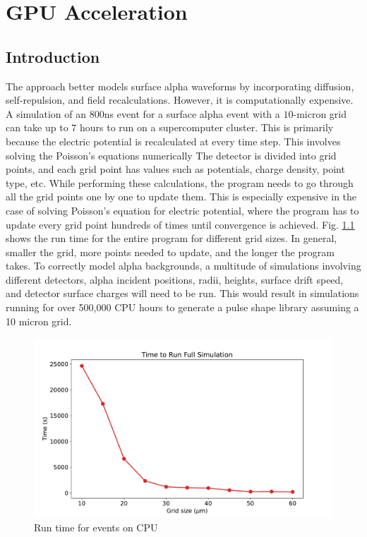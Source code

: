 \chapter{GPU Acceleration}
\label{chap4:gpu}
\section{Introduction}
 


The {\tdsim} approach better models surface alpha waveforms by incorporating diffusion, self-repulsion, and field recalculations. However, it is computationally expensive. A simulation of an $800$ns event for a surface alpha event with a $10$-micron grid can take up to $7$ hours to run on a supercomputer cluster. This is primarily because the electric potential is recalculated at every time step. This involves solving the Poisson's equations numerically The detector is divided into grid points, and each grid point has values such as potentials, charge density, point type, etc. While performing these calculations, the program needs to go through all the grid points one by one to update them. This is especially expensive in the case of solving Poisson's equation for electric potential, where the program has to update every grid point hundreds of times until convergence is achieved. Fig. \ref{fig:CPU_time} shows the run time for the entire program for different grid sizes. In general, smaller the grid, more points needed to update, and the longer the program takes. To correctly model alpha backgrounds, a multitude of simulations involving different detectors, alpha incident positions, radii, heights, surface drift speed, and detector surface charges will need to be run. This would result in simulations running for over 500,000 CPU hours to generate a pulse shape library assuming a 10 micron grid.

\begin{figure}
\centering
 \includegraphics[width=0.99\linewidth]{ch4/figs/cpu_run_time.pdf}
\caption{Run time for events on CPU}
\label{fig:CPU_time}
\end{figure}

